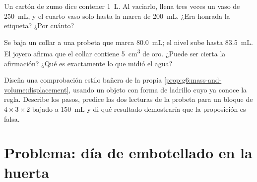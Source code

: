 \begin{exercise}[$\star\star$]\label{exo:g6:mass-and-volume:10}
Un cartón de zumo dice contener \qty{1}{L}. Al vaciarlo, llena tres
veces un vaso de \qty{250}{mL}, y el cuarto vaso solo hasta la marca
de \qty{200}{mL}. ¿Era honrada la etiqueta? ¿Por cuánto?
\end{exercise}

\begin{exercise}[$\star\star$]\label{exo:g6:mass-and-volume:11}
Se baja un collar a una probeta que marca \qty{80.0}{mL}; el nivel
sube hasta \qty{83.5}{mL}. El joyero afirma que el collar contiene
\qty{5}{cm^3} de oro. ¿Puede ser cierta la afirmación? ¿Qué es
exactamente lo que midió el agua?
\end{exercise}

\begin{exercise}[$\star\star\star$]\label{exo:g6:mass-and-volume:12}
Diseña una comprobación estilo bañera de la propia
\cref{prop:g6:mass-and-volume:displacement}, usando un objeto con
forma de ladrillo cuyo  ya conoce la regla. Describe los
pasos, predice las dos lecturas de la probeta para un bloque de
$4 \times 3 \times 2$  bajado a \qty{150}{mL} y di qué
resultado demostraría que la proposición es falsa.
\end{exercise}

\section{Problema: día de embotellado en la huerta}

